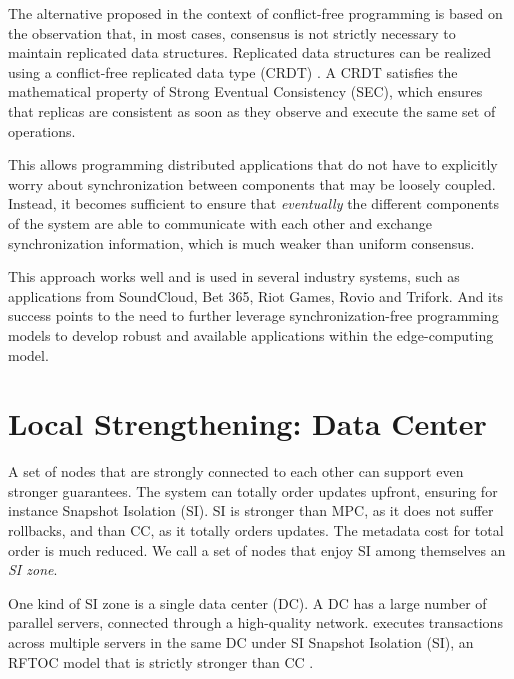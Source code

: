 The alternative proposed in the context of conflict-free programming is based on the observation that, in most cases, consensus is not strictly necessary to maintain replicated data structures. Replicated data structures can be realized using a conflict-free replicated data type (CRDT) \cite{shapiro2011conflict}. A CRDT satisfies the mathematical property of Strong Eventual Consistency (SEC), which ensures that replicas are consistent as soon as they observe and execute the same set of operations.

This allows programming distributed applications that do not have to explicitly worry about synchronization between components that may be loosely coupled. Instead, it becomes sufficient to ensure that \textit{eventually} the different components of the system are able to communicate with each other and exchange synchronization information, which is much weaker than uniform consensus.

This approach works well and is used in several industry systems, such as applications from SoundCloud, Bet 365, Riot Games, Rovio and Trifork. And its success points to the need to further leverage synchronization-free programming models to develop robust and available applications within the edge-computing model.

\section{Local Strengthening: Data Center}
\label{sec:strength-guar}

A set of nodes that are strongly connected to each other can support
even stronger guarantees.
The system can totally order updates upfront, ensuring for instance
Snapshot Isolation (SI).
SI is stronger than MPC, as it does not suffer rollbacks, and than CC,
as it totally orders updates.
The metadata cost for total order is much reduced.
We call a set of nodes that enjoy SI among themselves an \emph{SI zone}.

One kind of SI zone is a single data center (DC).
A DC has a large number of parallel servers, connected through a
high-quality network.
\system{} executes transactions across multiple servers in the same DC
under SI
Snapshot Isolation (SI), an RFTOC model that is strictly stronger
than CC \cite{rep:pan:1723, rep:pro:sh182}.

